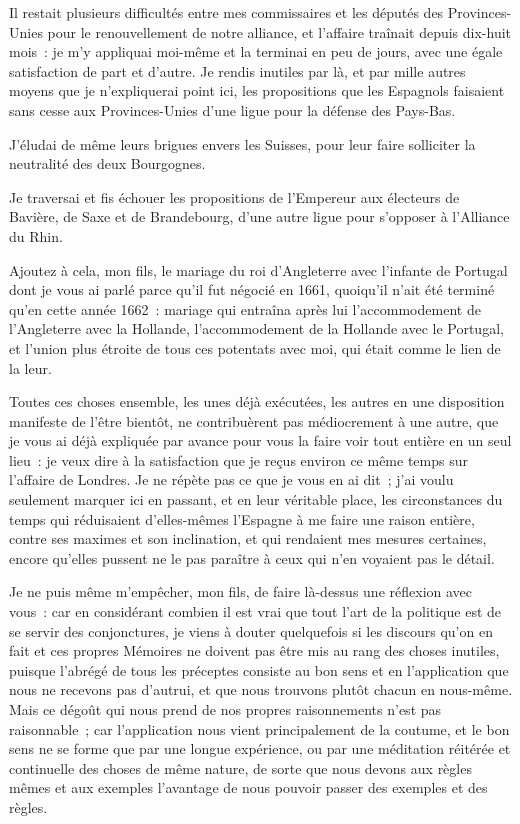\documentclass[french,twoside]{book} %
\begin{document}
Il restait plusieurs difficultés entre mes commissaires et les députés des Provinces-Unies pour le renouvellement de notre alliance, et l’affaire traînait depuis dix-huit mois : je m’y appliquai moi-même et la terminai en peu de jours, avec une égale satisfaction de part et d’autre. Je rendis inutiles par là, et par mille autres moyens que je n’expliquerai point ici, les propositions que les Espagnols faisaient sans cesse aux Provinces-Unies d’une ligue pour la défense des Pays-Bas.\par
J’éludai de même leurs brigues envers les Suisses, pour leur faire solliciter la neutralité des deux Bourgognes.\par
Je traversai et fis échouer les propositions de l’Empereur aux électeurs de Bavière, de Saxe et de Brandebourg, d’une autre ligue pour s’opposer à l’Alliance du Rhin.\par
Ajoutez à cela, mon fils, le mariage du roi d’Angleterre avec l’infante de Portugal dont je vous ai parlé parce qu’il fut négocié en 1661, quoiqu’il n’ait été terminé qu’en cette année 1662 : mariage qui entraîna après lui l’accommodement de l’Angleterre avec la Hollande, l’accommodement de la Hollande avec le Portugal, et l’union plus étroite de tous ces potentats avec moi, qui était comme le lien de la leur.\par
Toutes ces choses ensemble, les unes déjà exécutées, les autres en une disposition manifeste de l’être bientôt, ne contribuèrent pas médiocrement à une autre, que je vous ai déjà expliquée par avance pour vous la faire voir tout entière en un seul lieu : je veux dire à la satisfaction que je reçus environ ce même temps sur l’affaire de Londres. Je ne répète pas ce que je vous en ai dit ; j’ai voulu seulement marquer ici en passant, et en leur véritable place, les circonstances du temps qui réduisaient d’elles-mêmes l’Espagne à me faire une raison entière, contre ses maximes et son inclination, et qui rendaient mes mesures certaines, encore qu’elles pussent ne le pas paraître à ceux qui n’en voyaient pas le détail.\par
Je ne puis même m’empêcher, mon fils, de faire là-dessus une réflexion avec vous : car en considérant combien il est vrai que tout l’art de la politique est de se servir des conjonctures, je viens à douter quelquefois si les discours qu’on en fait et ces propres Mémoires ne doivent pas être mis au rang des choses inutiles, puisque l’abrégé de tous les préceptes consiste au bon sens et en l’application que nous ne recevons pas d’autrui, et que nous trouvons plutôt chacun en nous-même. Mais ce dégoût qui nous prend de nos propres raisonnements n’est pas raisonnable ; car l’application nous vient principalement de la coutume, et le bon sens ne se forme que par une longue expérience, ou par une méditation réitérée et continuelle des choses de même nature, de sorte que nous devons aux règles mêmes et aux exemples l’avantage de nous pouvoir passer des exemples et des règles.\par
\end{document}
